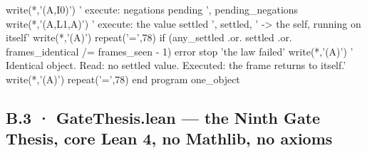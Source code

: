 \documentclass[10pt,twocolumn]{article}
\newenvironment{Shaded}{}{}
\newcommand{\CommentTok}[1]{#1}
\newcommand{\DecValTok}[1]{#1}
\newcommand{\FunctionTok}[1]{#1}
\newcommand{\KeywordTok}[1]{#1}
\newcommand{\NormalTok}[1]{#1}
\newcommand{\OperatorTok}[1]{#1}
\newcommand{\StringTok}[1]{#1}
\providecommand{\CommentTok}[1]{#1}
\providecommand{\DecValTok}[1]{#1}
\providecommand{\FunctionTok}[1]{#1}
\providecommand{\KeywordTok}[1]{#1}
\providecommand{\NormalTok}[1]{#1}
\providecommand{\OperatorTok}[1]{#1}
\providecommand{\StringTok}[1]{#1}
\providecommand{\textquotesingle}{'}
\providecommand{\CommentTok}[1]{#1}
\providecommand{\DecValTok}[1]{#1}
\providecommand{\FunctionTok}[1]{#1}
\providecommand{\KeywordTok}[1]{#1}
\providecommand{\NormalTok}[1]{#1}
\providecommand{\OperatorTok}[1]{#1}
\providecommand{\StringTok}[1]{#1}
\begin{document}
\begin{strip}
\begin{Shaded}
\begin{Highlighting}[]
  \FunctionTok{write(*}\NormalTok{,}\StringTok{\textquotesingle{}(A,I0)\textquotesingle{}}\FunctionTok{)}     \StringTok{\textquotesingle{}   execute: negations pending              \textquotesingle{}}\NormalTok{, pending\_negations}
  \FunctionTok{write(*}\NormalTok{,}\StringTok{\textquotesingle{}(A,L1,A)\textquotesingle{}}\FunctionTok{)}   \StringTok{\textquotesingle{}   execute: the value settled              \textquotesingle{}}\NormalTok{, settled, }\StringTok{\textquotesingle{}   {-}\textgreater{} the self, running on itself\textquotesingle{}}
  \FunctionTok{write(*}\NormalTok{,}\StringTok{\textquotesingle{}(A)\textquotesingle{}}\FunctionTok{)} \FunctionTok{repeat}\NormalTok{(}\StringTok{\textquotesingle{}=\textquotesingle{}}\NormalTok{,}\DecValTok{78}\NormalTok{)}
  \KeywordTok{if}\NormalTok{ (any\_settled }\OperatorTok{.or.}\NormalTok{ settled }\OperatorTok{.or.}\NormalTok{ frames\_identical }\OperatorTok{/=}\NormalTok{ frames\_seen }\KeywordTok{{-}} \DecValTok{1}\NormalTok{)}\CommentTok{ error stop \textquotesingle{}the law failed\textquotesingle{}}
  \FunctionTok{write(*}\NormalTok{,}\StringTok{\textquotesingle{}(A)\textquotesingle{}}\FunctionTok{)} \StringTok{\textquotesingle{} Identical object. Read: no settled value. Executed: the frame returns to itself.\textquotesingle{}}
  \FunctionTok{write(*}\NormalTok{,}\StringTok{\textquotesingle{}(A)\textquotesingle{}}\FunctionTok{)} \FunctionTok{repeat}\NormalTok{(}\StringTok{\textquotesingle{}=\textquotesingle{}}\NormalTok{,}\DecValTok{78}\NormalTok{)}
\KeywordTok{end program}\NormalTok{ one\_object}
\end{Highlighting}
\end{Shaded}
\end{strip}

\subsection{B.3 · GateThesis.lean --- the Ninth Gate Thesis, core Lean
4, no Mathlib, no
axioms}\label{b.3-gatethesis.lean-the-ninth-gate-thesis-core-lean-4-no-mathlib-no-axioms}
\end{document}
